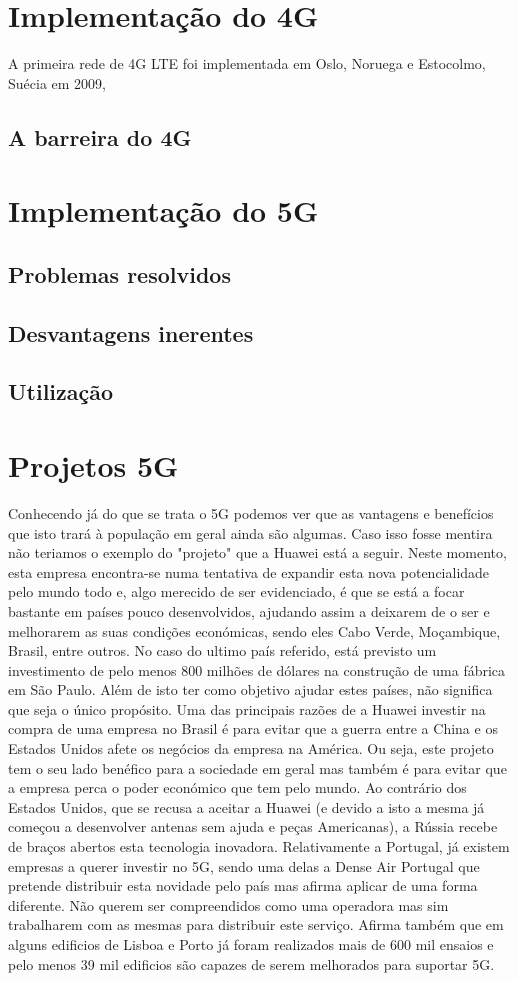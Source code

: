 \documentclass{llncs}
\begin{document}
\section{Implementação do 4G}
A primeira rede de 4G LTE foi implementada em Oslo, Noruega e 
Estocolmo, Suécia em 2009,

\subsection{A barreira do 4G}
\section{Implementação do 5G}
\subsection{Problemas resolvidos}
\subsection{Desvantagens inerentes}
\subsection{Utilização}
\section{Projetos 5G}
Conhecendo já do que se trata o 5G podemos ver que as vantagens e 
benefícios que isto trará à população em geral ainda são algumas.
Caso isso fosse mentira não teriamos o exemplo do "projeto" que a
Huawei está a seguir. Neste momento, esta empresa encontra-se numa 
tentativa de expandir esta nova potencialidade pelo mundo todo e,
algo merecido de ser evidenciado, é que se está a focar bastante em
países pouco desenvolvidos, ajudando assim a deixarem de o ser e melhorarem as suas
condições económicas, sendo eles Cabo Verde, Moçambique, Brasil, entre
outros. No caso do ultimo país referido, está previsto um investimento
de pelo menos 800 milhões de dólares na construção de uma fábrica em 
São Paulo. Além de isto ter como objetivo ajudar estes países, não significa 
que seja o único propósito. Uma das principais razões de a Huawei investir na compra
de uma empresa no Brasil é para evitar que a guerra entre a China e os Estados Unidos
afete os negócios da empresa na América. Ou seja, este projeto tem o seu lado benéfico
para a sociedade em geral mas também é para evitar que a empresa perca o poder económico
que tem pelo mundo.
Ao contrário dos Estados Unidos, que se recusa a aceitar a Huawei (e devido a isto
a mesma já começou a desenvolver antenas sem ajuda e peças Americanas), a Rússia recebe de braços
abertos esta tecnologia inovadora. Relativamente a Portugal, já existem empresas a querer
investir no 5G, sendo uma delas a Dense Air Portugal que pretende distribuir esta novidade
pelo país mas afirma aplicar de uma forma diferente. Não querem ser compreendidos como 
uma operadora mas sim trabalharem com as mesmas para distribuir este serviço. Afirma também
que em alguns edificios de Lisboa e Porto já foram realizados mais de 600 mil ensaios e pelo menos 39 mil edificios são capazes de serem melhorados para suportar 5G.
\end{document}
